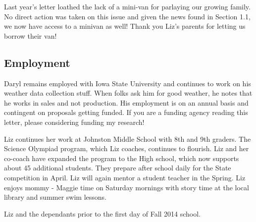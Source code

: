 \documentclass{article}
\makeatletter
\newenvironment{figurehere}
  {\def\@captype{figure}}
  {}
\makeatother
\begin{document}
\begin{multicols}{2}
Last year's letter loathed the lack of a mini-van for parlaying our 
growing family.  No direct action was taken on this issue and given the 
news found in Section 1.1, we now have access to a minivan as well!  Thank 
you Liz's parents for letting us borrow their van!

\subsection{Employment}
Daryl remains employed with Iowa State University and continues to work on 
his weather data collection stuff.  When folks ask him for good weather, 
he notes that he works in sales and not production.  His employment is on 
an annual basis and contingent on proposals getting funded.  If you are a 
funding agency reading this letter, please considering funding my research!

Liz continues her work at Johnston Middle School with 8th and 9th graders. 
The Science Olympiad program, which Liz coaches, continues to flourish. 
Liz and her co-coach have expanded the program to the High school, which 
now supports about 45 additional students.  They prepare after school 
daily for the State competition in April.  Liz will again mentor a student 
teacher in the Spring.  Liz enjoys mommy - Maggie time on Saturday 
mornings with story time at the local library and summer swim lessons.

\begin{figurehere}
 \centering   
 \caption{Liz and the dependants prior to the first day of Fall 2014 
school.}
\end{figurehere}


\end{multicols}
\end{document}
